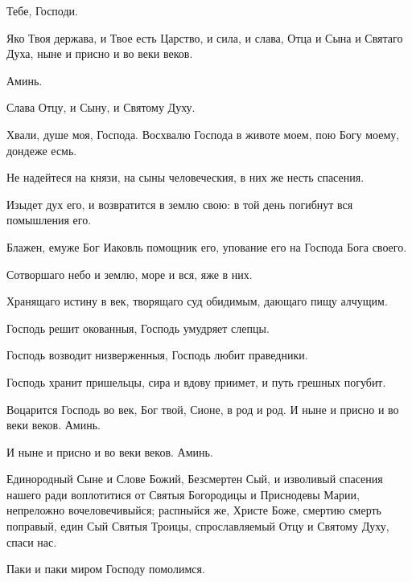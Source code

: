 \begin{mymulticols}
 Тебе, Господи. 

 Яко Твоя держава, и Твое есть Царство, и сила, и слава, Отца и Сына и Святаго Духа, ныне и присно и во веки веков. 

 Аминь. 



 Слава Отцу, и Сыну, и Святому Духу. 

 Хвали, душе моя, Господа. Восхвалю Господа в животе моем, пою Богу моему, дондеже есмь. 

 Не надейтеся на князи, на сыны человеческия, в них же несть спасения. 

 Изыдет дух его, и возвратится в землю свою: в той день погибнут вся помышления его. 

 Блажен, емуже Бог Иаковль помощник его, упование его на Господа Бога своего. 

 Сотворшаго небо и землю, море и вся, яже в них. 

 Хранящаго истину в век, творящаго суд обидимым, дающаго пищу алчущим. 

 Господь решит окованныя, Господь умудряет слепцы. 

 Господь возводит низверженныя, Господь любит праведники. 

 Господь хранит пришельцы, сира и вдову приимет, и путь грешных погубит. 

 Воцарится Господь во век, Бог твой, Сионе, в род и род. И ныне и присно и во веки веков. Аминь. 

 И ныне и присно и во веки веков. Аминь. 


 Единородный Сыне и Слове Божий, Безсмертен Сый, и изволивый спасения нашего ради воплотитися от Святыя Богородицы и Приснодевы Марии, непреложно вочеловечивыйся; распныйся же, Христе Боже, смертию смерть поправый, един Сый Святыя Троицы, спрославляемый Отцу и Святому Духу, спаси нас. 


 Паки и паки миром Господу помолимся. 


\end{mymulticols}
